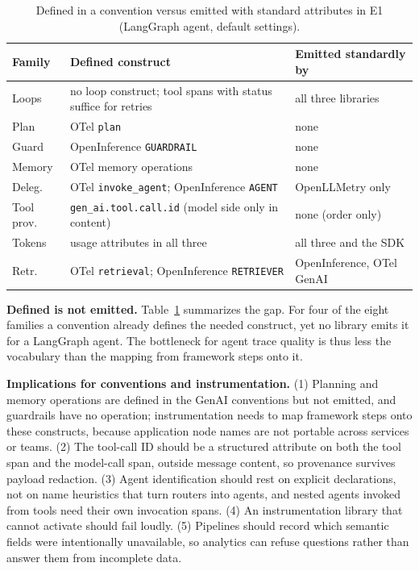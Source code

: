 \documentclass[conference]{IEEEtran}
\begin{document}
\begin{table}[t]
\centering
\scriptsize
\caption{Defined in a convention versus emitted with standard attributes
in E1 (LangGraph agent, default settings).}
\label{tab:defined}
\begin{tabular}{@{}lp{}p{}@{}}
\toprule
Family & Defined construct & Emitted standardly by \\
\midrule
Loops & no loop construct; tool spans with status suffice for retries & all three libraries \\
Plan & OTel \texttt{plan} & none \\
Guard & OpenInference \texttt{GUARDRAIL} & none \\
Memory & OTel memory operations & none \\
Deleg. & OTel \texttt{invoke\_agent}; OpenInference \texttt{AGENT} & OpenLLMetry only \\
Tool prov. & \texttt{gen\_ai.tool.call.id} (model side only in content) & none (order only) \\
Tokens & usage attributes in all three & all three and the SDK \\
Retr. & OTel \texttt{retrieval}; OpenInference \texttt{RETRIEVER} & OpenInference, OTel GenAI \\
\bottomrule
\end{tabular}
\end{table}

\textbf{Defined is not emitted.} Table~\ref{tab:defined} summarizes the
gap. For four of the eight families a convention already defines the
needed construct, yet no library emits it for a LangGraph agent. The
bottleneck for agent trace quality is thus less the vocabulary than the
mapping from framework steps onto it.

\textbf{Implications for conventions and instrumentation.} (1) Planning
and memory operations are defined in the GenAI conventions but not
emitted, and guardrails have no operation; instrumentation needs to map
framework steps onto these constructs, because application node names
are not portable across services or teams.
(2) The tool-call ID should be a structured attribute on both the tool
span and the model-call span, outside message content, so provenance
survives payload redaction. (3) Agent identification should rest on
explicit declarations, not on name heuristics that turn routers into
agents, and nested agents invoked from tools need their own invocation
spans. (4) An instrumentation library that cannot activate should fail
loudly. (5) Pipelines should record which semantic fields were
intentionally unavailable, so analytics can refuse questions rather
than answer them from incomplete data.
\end{document}
